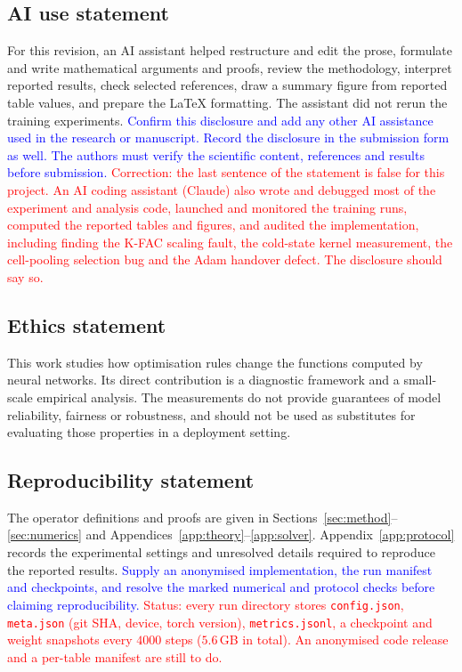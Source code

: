 \documentclass{article}
\newcommand{\zied}[1]{\textcolor{blue}{#1}}
\newcommand{\nat}[1]{\textcolor{red}{#1}}
\theoremstyle{definition}
\theoremstyle{remark}
\begin{document}
\subsection*{AI use statement}
For this revision, an AI assistant helped restructure and edit the prose, formulate and write mathematical arguments and proofs, review the methodology, interpret reported results, check selected references, draw a summary figure from reported table values, and prepare the LaTeX formatting. The assistant did not rerun the training experiments.
\zied{Confirm this disclosure and add any other AI assistance used in the research or manuscript. Record the disclosure in the submission form as well. The authors must verify the scientific content, references and results before submission.}
\nat{Correction: the last sentence of the statement is false for this project. An AI coding assistant (Claude) also wrote and debugged most of the experiment and analysis code, launched and monitored the training runs, computed the reported tables and figures, and audited the implementation, including finding the K-FAC scaling fault, the cold-state kernel measurement, the cell-pooling selection bug and the Adam handover defect. The disclosure should say so.}

\subsection*{Ethics statement}
This work studies how optimisation rules change the functions computed by neural networks. Its direct contribution is a diagnostic framework and a small-scale empirical analysis. The measurements do not provide guarantees of model reliability, fairness or robustness, and should not be used as substitutes for evaluating those properties in a deployment setting.

\subsection*{Reproducibility statement}
The operator definitions and proofs are given in Sections~\ref{sec:method}--\ref{sec:numerics} and Appendices~\ref{app:theory}--\ref{app:solver}. Appendix~\ref{app:protocol} records the experimental settings and unresolved details required to reproduce the reported results.
\zied{Supply an anonymised implementation, the run manifest and checkpoints, and resolve the marked numerical and protocol checks before claiming reproducibility.}
\nat{Status: every run directory stores \texttt{config.json}, \texttt{meta.json} (git SHA, device, torch version), \texttt{metrics.jsonl}, a checkpoint and weight snapshots every $4000$ steps ($5.6$\,GB in total). An anonymised code release and a per-table manifest are still to do.}
\end{document}
